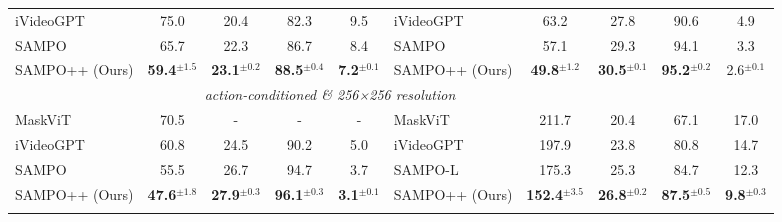 \begin{table}[t]
{\begin{tabular}{lcccc|lcccc}
        iVideoGPT~\cite{wu2024ivideogpt} & 75.0                    & 20.4                     & 82.3                     & 9.5                        & iVideoGPT~\cite{wu2024ivideogpt} & 63.2                    & 27.8                     & 90.6                     & 4.9                       \\ 
        SAMPO~\cite{wang2025sampo} & 65.7 & 22.3 & 86.7 & 8.4 & SAMPO~\cite{wang2025sampo} & 57.1 & 29.3 & 94.1 & 3.3 \\
        \midrule
        \rowcolor{lightblue}
        SAMPO++ (Ours) & \textbf{59.4}$^{\pm 1.5}$ & \textbf{23.1}$^{\pm 0.2}$ & \textbf{88.5}$^{\pm 0.4}$ & \textbf{7.2}$^{\pm 0.1}$ & SAMPO++ (Ours) & \textbf{49.8}$^{\pm 1.2}$ & \textbf{30.5}$^{\pm 0.1}$ & \textbf{95.2}$^{\pm 0.2}$ & 2.6$^{\pm 0.1}$ \\

        \midrule
        \rowcolor{grey}
        \multicolumn{5}{c|}{\textit{action-conditioned \& 64×64 resolution}}                                                    & \multicolumn{5}{c}{\textit{action-conditioned \& 256×256 resolution}}                                                 \\
        MaskViT~\cite{gupta2022maskvit}   & 70.5                    & -                        & -                        & -                          & MaskViT~\cite{gupta2022maskvit}   & 211.7                   & 20.4                     & 67.1                     & 17.0                      \\
        iVideoGPT~\cite{wu2024ivideogpt} & 60.8                    & 24.5                     & 90.2                     & 5.0                        & iVideoGPT~\cite{wu2024ivideogpt} & 197.9                   & 23.8                     & 80.8                     & 14.7                      \\
        SAMPO~\cite{wang2025sampo}     & \multicolumn{1}{c}{55.5}    & \multicolumn{1}{c}{26.7}     & \multicolumn{1}{c}{94.7}     & \multicolumn{1}{c|}{3.7}      & SAMPO-L~\cite{wang2025sampo}    & \multicolumn{1}{c}{175.3}    & \multicolumn{1}{c}{25.3}     & \multicolumn{1}{c}{84.7}     & \multicolumn{1}{c}{12.3}      \\ 
    
        \midrule
        \rowcolor{lightblue}
        SAMPO++ (Ours) & \textbf{47.6}$^{\pm 1.8}$ & \textbf{27.9}$^{\pm 0.3}$ & \textbf{96.1}$^{\pm 0.3}$ & \textbf{3.1}$^{\pm 0.1}$ & SAMPO++ (Ours) & \textbf{152.4}$^{\pm 3.5}$ & \textbf{26.8}$^{\pm 0.2}$ & \textbf{87.5}$^{\pm 0.5}$ & \textbf{9.8}$^{\pm 0.3}$ \\
    
        \bottomrule
    \vspace{-3ex}
    \end{tabular}
}
\end{table}
